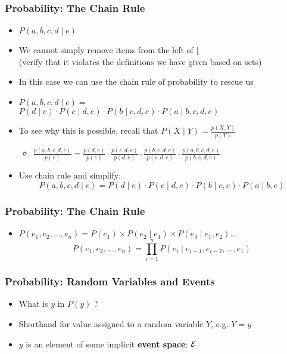 \begin{frame}
\frametitle{Probability: The Chain Rule}
\begin{itemize}[<+->]
\item $P(a,b,c,d \mid e)$
\item We cannot simply remove items from the left of $\mid$ \\
(verify that it violates the definitions we have given based on sets)
\item In this case we can use the chain rule of probability to rescue
  us
\item $P(a,b,c,d \mid e) = $\\
$P(d \mid e) \cdot P(c \mid d,e) \cdot P(b \mid c,d,e) \cdot P(a \mid b,c,d,e)$ 
\item To see why this is possible, recall that \( P(X \mid Y) = \frac{p(X,Y)}{p(Y)} \)
\begin{itemize}
\item $\frac{ p(a,b,c,d,e) }{ p(e) } = \frac{p(d,e)}{p(e)} \cdot \frac{p(c,d,e)}{p(d,e)} \cdot \frac{p(b,c,d,e)}{p(c,d,e)} \cdot \frac{p(a,b,c,d,e)}{p(b,c,d,e)} $
\end{itemize}
\item Use chain rule and simplify:
\[ P(a,b,c,d \mid e) = P(d \mid e) \cdot P(c \mid d, e) \cdot P(b \mid c, e) \cdot P(a \mid b, e) \]
\end{itemize}

\end{frame}

\begin{frame}
\frametitle{Probability: The Chain Rule}
\begin{itemize}[<+->]
\item $P(e_1, e_2, \ldots, e_n) = P(e_1) \times P(e_2 \mid
  e_1) \times P(e_3 \mid e_1, e_2) \ldots $ 
\[ P(e_1, e_2, \ldots, e_n) = \prod^n_{i=1} P(e_i \mid e_{i-1},
  e_{i-2}, \ldots, e_1) \]
\end{itemize}

\end{frame}

\begin{frame}
\frametitle{Probability: Random Variables and Events}
\begin{itemize}[<+->]
\item What is $y$ in $P(y)$ ?
\item Shorthand for value assigned to a random variable $Y$, e.g. $Y = y$
\item $y$ is an element of some implicit {\bf event space}: ${\cal E}$
\end{itemize}

\end{frame}

